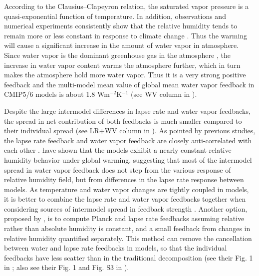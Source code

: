 According to the Clausius--Clapeyron relation, the saturated vapor pressure is a quasi-exponential function of temperature. In addition, observations and numerical experiments consistently show that the relative humidity tends to remain more or less constant in response to climate change \citep{Held2000water,Soden2006,Goosse2010introduction}. Thus the warming will cause a significant increase in the amount of water vapor in atmosphere. Since water vapor is the dominant greenhouse gas in the atmosphere \citep{Held2000water}, the increase in water vapor content warms the atmosphere further, which in turn makes the atmosphere hold more water vapor. Thus it is a very strong positive feedback and the multi-model mean value of global mean water vapor feedback in CMIP5/6 models is about 1.8 Wm$^{-2}$K$^{-1}$ (see WV column in ).

Despite the large intermodel differences in lapse rate and water vapor feedbacks, the spread in net contribution of both feedbacks is much smaller compared to their individual spread (see LR+WV column in ). As pointed by previous studies, the lapse rate feedback and water vapor feedback are closely anti-correlated with each other \citep{Soden2006,PoChedley2018}. \cite{Soden2006} have shown that the models exhibit a nearly constant relative humidity behavior under global warming, suggesting that most of the intermodel spread in water vapor feedback does not step from the various response of relative humidity field, but from differences in the lapse rate response between models. As temperature and water vapor changes are tightly coupled in models, it is better to combine the lapse rate and water vapor feedbacks together when considering sources of intermodel spread in feedback strength \citep{Soden2006,PoChedley2018}. Another option, proposed by \cite{Held_Shell2012}, is to compute Planck and lapse rate feedbacks assuming relative rather than absolute humidity is constant, and a small feedback from changes in relative humidity quantified separately. This method can remove the cancellation between water and lapse rate feedbacks in models, so that the individual feedbacks have less scatter than in the traditional decomposition (see their Fig. 1 in \citealt{Held_Shell2012}; also see their Fig. 1 and Fig. S3 in \citealt{Zelinka2020causes}).

